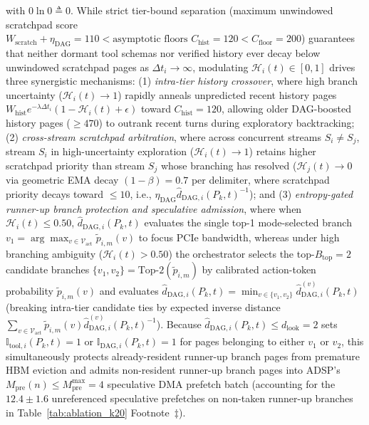 \documentclass[conference,10pt]{IEEEtran}
\begin{document}
with $0\ln 0 \triangleq 0$. While strict tier-bound separation (maximum unwindowed scratchpad score $W_{\text{scratch}} + \eta_{\text{DAG}} = 110 < \text{asymptotic floors } C_{\text{hist}} = 120 < C_{\text{floor}} = 200$) guarantees that neither dormant tool schemas nor verified history ever decay below unwindowed scratchpad pages as $\Delta t_i \to \infty$, modulating $\mathcal{H}_i(t) \in [0, 1]$ drives three synergistic mechanisms: (1) \textit{intra-tier history crossover}, where high branch uncertainty ($\mathcal{H}_i(t) \to 1$) rapidly anneals unpredicted recent history pages $W_{\text{hist}}e^{-\lambda \Delta t_i}(1 - \mathcal{H}_i(t) + \epsilon)$ toward $C_{\text{hist}} = 120$, allowing older DAG-boosted history pages ($\ge 470$) to outrank recent turns during exploratory backtracking; (2) \textit{cross-stream scratchpad arbitration}, where across concurrent streams $S_i \ne S_j$, stream $S_i$ in high-uncertainty exploration ($\mathcal{H}_i(t) \to 1$) retains higher scratchpad priority than stream $S_j$ whose branching has resolved ($\mathcal{H}_j(t) \to 0$ via geometric EMA decay $(1-\beta)=0.7$ per delimiter, where scratchpad priority decays toward $\le 10$, i.e., $\eta_{\text{DAG}}\hat{d}_{\text{DAG},i}(P_k, t)^{-1}$); and (3) \textit{entropy-gated runner-up branch protection and speculative admission}, where when $\mathcal{H}_i(t) \le 0.50$, $\hat{d}_{\text{DAG},i}(P_k, t)$ evaluates the single top-1 mode-selected branch $v_1 = \arg\max_{v \in \mathcal{V}_{\text{act}}} \tilde{p}_{i,m}(v)$ to focus PCIe bandwidth, whereas under high branching ambiguity ($\mathcal{H}_i(t) > 0.50$) the orchestrator selects the top-$B_{\text{top}}=2$ candidate branches $\{v_1, v_2\} = \text{Top-}2(\tilde{p}_{i,m})$ by calibrated action-token probability $\tilde{p}_{i,m}(v)$ and evaluates $\hat{d}_{\text{DAG},i}(P_k, t) = \min_{v \in \{v_1, v_2\}} \hat{d}_{\text{DAG},i}^{(v)}(P_k, t)$ (breaking intra-tier candidate ties by expected inverse distance $\sum_{v \in \mathcal{V}_{\text{act}}} \tilde{p}_{i,m}(v)\hat{d}_{\text{DAG},i}^{(v)}(P_k, t)^{-1}$). Because $\hat{d}_{\text{DAG},i}(P_k, t) \le d_{\text{look}} = 2$ sets $\mathbb{I}_{\text{tool},i}(P_k, t) = 1$ or $\mathbb{I}_{\text{DAG},i}(P_k, t) = 1$ for pages belonging to either $v_1$ or $v_2$, this simultaneously protects already-resident runner-up branch pages from premature HBM eviction and admits non-resident runner-up branch pages into ADSP's $M_{\text{pre}}(n) \le M_{\text{pre}}^{\max} = 4$ speculative DMA prefetch batch (accounting for the $12.4 \pm 1.6$ unreferenced speculative prefetches on non-taken runner-up branches in Table~\ref{tab:ablation_k20} Footnote~$\ddagger$).
\end{document}

